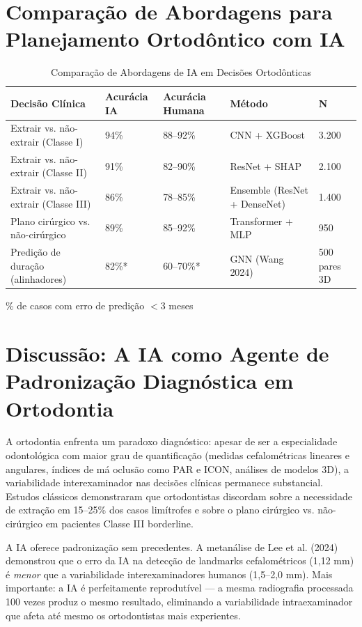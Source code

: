 \section{Comparação de Abordagens para Planejamento Ortodôntico com IA}

\begin{table}[H]
\centering
\caption{Comparação de Abordagens de IA em Decisões Ortodônticas}
\label{tab:orto-decision-comparison}
\begin{tabular}{p{2.8cm}p{2cm}p{2.2cm}p{2.5cm}p{2.2cm}}
\toprule
\textbf{Decisão Clínica} & \textbf{Acurácia IA} & \textbf{Acurácia Humana} & \textbf{Método} & \textbf{N} \\
\midrule
Extrair vs. não-extrair (Classe I) & 94\% & 88--92\% & CNN + XGBoost & 3.200 \\
Extrair vs. não-extrair (Classe II) & 91\% & 82--90\% & ResNet + SHAP & 2.100 \\
Extrair vs. não-extrair (Classe III) & 86\% & 78--85\% & Ensemble (ResNet + DenseNet) & 1.400 \\
Plano cirúrgico vs. não-cirúrgico & 89\% & 85--92\% & Transformer + MLP & 950 \\
Predição de duração (alinhadores) & 82\%* & 60--70\%* & GNN (Wang 2024) & 500 pares 3D \\
\bottomrule
\end{tabular}
\par\small *\% de casos com erro de predição $<3$ meses
\end{table}

\section{Discussão: A IA como Agente de Padronização Diagnóstica em Ortodontia}

A ortodontia enfrenta um paradoxo diagnóstico: apesar de ser a especialidade odontológica com maior grau de quantificação (medidas cefalométricas lineares e angulares, índices de má oclusão como PAR e ICON, análises de modelos 3D), a variabilidade interexaminador nas decisões clínicas permanece substancial. Estudos clássicos demonstraram que ortodontistas discordam sobre a necessidade de extração em 15--25\% dos casos limítrofes e sobre o plano cirúrgico vs. não-cirúrgico em pacientes Classe III borderline.

A IA oferece padronização sem precedentes. A metanálise de Lee et al. (2024) demonstrou que o erro da IA na detecção de landmarks cefalométricos (1,12 mm) é \textit{menor} que a variabilidade interexaminadores humanos (1,5--2,0 mm). Mais importante: a IA é perfeitamente reprodutível --- a mesma radiografia processada 100 vezes produz o mesmo resultado, eliminando a variabilidade intraexaminador que afeta até mesmo os ortodontistas mais experientes.

